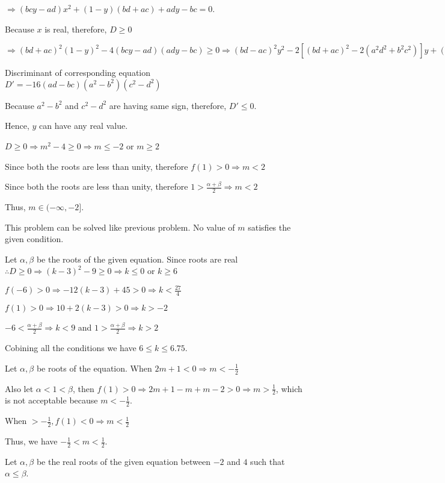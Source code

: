   $\Rightarrow (bcy - ad)x^2 + (1 - y)(bd + ac) + ady - bc = 0$.

  Because $x$ is real, therefore, $D\geq 0$

  $\Rightarrow (bd + ac)^2(1 - y)^2 - 4(bcy - ad)(ady - bc)\geq 0\Rightarrow (bd - ac)^2y^2 - 2[(bd + ac)^2
    - 2(a^2d^2 + b^2c^2)]y + (bd - ac)^2\geq 0$

  Discriminant of corresponding equation $D' = -16(ad - bc)(a^2 - b^2)(c^2 - d^2)$

  Because $a^2 - b^2$ and $c^2 - d^2$ are having same sign, therefore, $D' \leq 0$.

  Hence, $y$ can have any real value.
\item $D\geq 0 \Rightarrow m^2 - 4\geq 0 \Rightarrow m\leq - 2$ or $m\geq 2$

  Since both the roots are less than unity, therefore $f(1) > 0 \Rightarrow m < 2$

  Since both the roots are less than unity, therefore $1 > \frac{\alpha + \beta}{2}\Rightarrow m < 2$

  Thus, $m\in(-\infty, -2]$.
\item This problem can be solved like previous problem. No value of $m$ satisfies the given condition.
\item Let $\alpha, \beta$ be the roots of the given equation. Since roots are real $\therefore D\geq
  0 \Rightarrow (k - 3)^2 - 9\geq 0 \Rightarrow k\leq 0$ or $k\geq 6$

  $f(-6) > 0 \Rightarrow -12(k - 3) + 45 > 0 \Rightarrow k < \frac{27}{4}$

  $f(1) > 0 \Rightarrow 10 + 2(k - 3) > 0 \Rightarrow k > -2$

  $-6 < \frac{\alpha + \beta}{2}\Rightarrow k < 9$ and $1 > \frac{\alpha + \beta}{2}\Rightarrow k > 2$

  Cobining all the conditions we have $6\leq k\leq 6.75$.
\item Let $\alpha, \beta$ be roots of the equation. When $2m + 1 < 0\Rightarrow m < -\frac{1}{2}$

  Also let $\alpha < 1 < \beta$, then $f(1) > 0\Rightarrow 2m + 1 - m + m - 2 > 0 \Rightarrow m
  > \frac{1}{2}$, which is not acceptable because $m < -\frac{1}{2}$.

  When $ > -\frac{1}{2}, f(1) < 0\Rightarrow m < \frac{1}{2}$

  Thus, we have $-\frac{1}{2} < m < \frac{1}{2}$.
\item Let $\alpha, \beta$ be the real roots of the given equation between $-2$ and $4$ such that
  $\alpha \leq \beta$.

